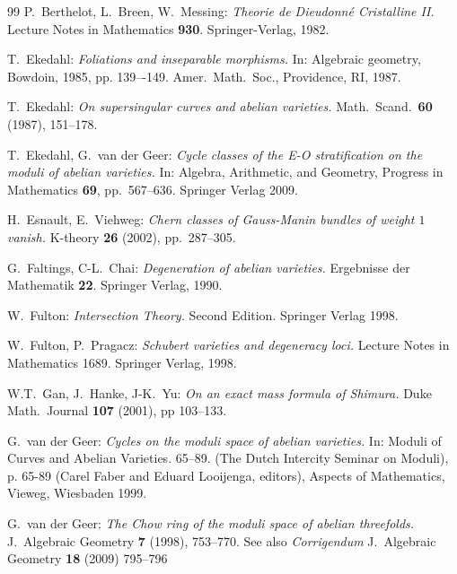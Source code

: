 \begin{thebibliography}{99}
P.\ Berthelot, L.\ Breen, W.\ Messing:
{\sl Theorie de Dieudonn\'e Cristalline II.}
Lecture Notes in Mathematics \textbf{930}.
Springer-Verlag, 1982.

T.\ Ekedahl: {\sl Foliations and inseparable morphisms.} In: 
Algebraic geometry, Bowdoin, 1985, pp. 139–-149. 
Amer.\ Math.\ Soc., Providence, RI, 1987.

 T.\ Ekedahl:
{\sl On supersingular curves and abelian varieties.}
Math.\ Scand.\ \textbf{60} (1987), 151--178.

 T.\ Ekedahl, G.\ van der Geer:
{\sl Cycle classes of the E-O stratification on the moduli of abelian varieties.}
In: {Algebra, Arithmetic, and Geometry}, Progress in Mathematics \textbf{69}, pp.\
567--636.
Springer Verlag 2009.

 H.\ Esnault, E.\ Viehweg:
{\sl Chern classes of Gauss-Manin bundles of weight $1$ vanish. }
K-theory \textbf{26} (2002), pp.\ 287--305.


 G.\ Faltings, C-L.\ Chai: 
{\sl Degeneration of abelian varieties.}
Ergebnisse der Mathematik \textbf{22}.  Springer Verlag, 1990.

 W.\ Fulton:
{\sl Intersection Theory.} Second Edition. Springer Verlag 1998.

 W.\ Fulton, P.\ Pragacz:
{\sl Schubert varieties and degeneracy loci.}
Lecture Notes in Mathematics 1689.
Springer Verlag, 1998. 

 W.T.\ Gan, J.\ Hanke, J-K.\ Yu:
{\sl On an exact mass formula of Shimura.}
Duke Math.\ Journal
\textbf{107} (2001), pp 103--133.

 G.\ van der Geer:
{\sl Cycles on the moduli space of abelian varieties.}
In: Moduli of Curves and Abelian Varieties. 65--89.
(The Dutch Intercity Seminar on Moduli), p. 65-89 (Carel Faber and Eduard Looijenga, editors), Aspects of Mathematics, Vieweg, Wiesbaden 1999. 

 G.\ van der Geer:
{\sl The Chow ring of the moduli space of abelian threefolds.}
J.\ Algebraic Geometry \textbf{7} (1998), 753--770. See
also {\sl Corrigendum} J.\ Algebraic Geometry \textbf{18} (2009) 795--796



\end{thebibliography}

